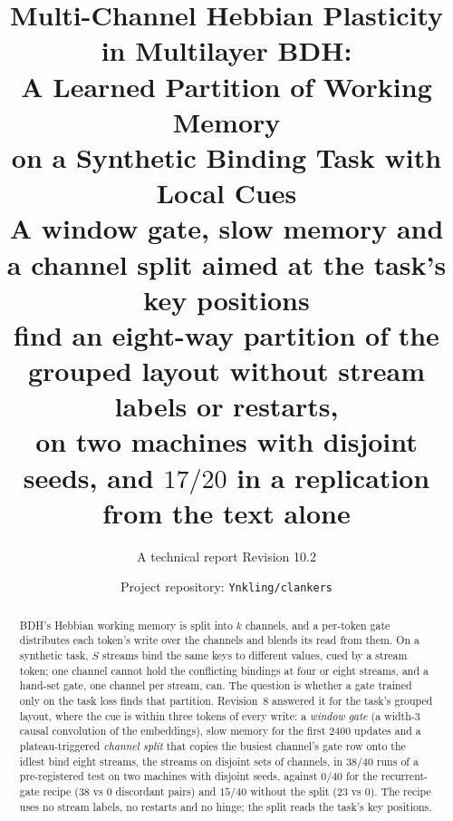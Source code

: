 \documentclass[11pt]{article}
\title{\vspace{-2.5em}\bfseries Multi-Channel Hebbian Plasticity in Multilayer BDH:\\
A Learned Partition of Working Memory\\ on a Synthetic Binding Task with Local Cues\\[0.3em]
\large\normalfont A window gate, slow memory and a channel split aimed at the task's key positions\\ find an eight-way partition of the grouped layout without stream labels or restarts,\\ on two machines with disjoint seeds, and $17/20$ in a replication from the text alone}
\author{A technical report \quad\textbullet\quad Revision 10.2}
\date{Project repository: \texttt{Ynkling/clankers}}
\begin{document}
\maketitle
\vspace{-1.5em}

\begin{abstract}
BDH's Hebbian working memory is split into $k$ channels, and a per-token gate distributes each token's write over the channels and blends its read from them. On a synthetic task, $S$ streams bind the same keys to different values, cued by a stream token; one channel cannot hold the conflicting bindings at four or eight streams, and a hand-set gate, one channel per stream, can. The question is whether a gate trained only on the task loss finds that partition. Revision~8 answered it for the task's grouped layout, where the cue is within three tokens of every write: a \emph{window gate} (a width-3 causal convolution of the embeddings), slow memory for the first 2400 updates and a plateau-triggered \emph{channel split} that copies the busiest channel's gate row onto the idlest bind eight streams, the streams on disjoint sets of channels, in $38/40$ runs of a pre-registered test on two machines with disjoint seeds, against $0/40$ for the recurrent-gate recipe (38 vs 0 discordant pairs) and $15/40$ without the split (23 vs 0). The recipe uses no stream labels, no restarts and no hinge; the split reads the task's key positions.


\end{abstract}
\end{document}
